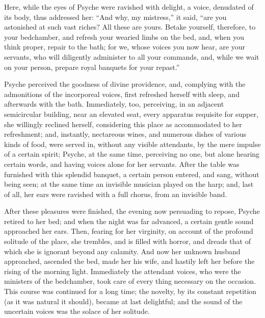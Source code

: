 \documentclass[12pt]{article}
\begin{document}
Here, while the eyes of Psyche were ravished with delight, a voice, denudated
of its body, thus addressed her: ``And why, my mistress,'' it said, ``are you
astonished at such vast riches? All these are yours. Betake yourself,
therefore, to your bedchamber, and refresh your wearied limbs on the bed, and,
when you think proper, repair to the bath; for we, whose voices you now hear,
are your servants, who will diligently administer to all your commands, and,
while we wait on your person, prepare royal banquets for your repast.''

Psyche perceived the goodness of divine providence, and, complying with the
admonitions of the incorporeal voices, first refreshed herself with sleep, and
afterwards with the bath. Immediately, too, perceiving, in an adjacent
semicircular building, near an elevated seat, every apparatus requisite for
supper, she willingly reclined herself, considering this place as accommodated
to her refreshment; and, instantly, nectareous wines, and numerous dishes of
various kinds of food, were served in, without any visible attendants, by the
mere impulse of a certain spirit; Psyche, at the same time, perceiving no one,
but alone hearing certain words, and having voices alone for her servants.
After the table was furnished with this splendid banquet, a certain person
entered, and sang, without being seen; at the same time an invisible musician
played on the harp; and, last of all, her ears were ravished with a full
chorus, from an invisible band.

After these pleasures were finished, the evening now persuading to repose,
Psyche retired to her bed; and when the night was far advanced, a certain
gentle sound approached her ears. Then, fearing for her virginity, on account
of the profound solitude of the place, she trembles, and is filled with horror,
and dreads that of which she is ignorant beyond any calamity. And now her
unknown husband approached, ascended the bed, made her his wife, and hastily
left her before the rising of the morning light. Immediately the attendant
voices, who were the ministers of the bedchamber, took care of every thing
necessary on the occasion. This course was continued for a long time; the
novelty, by its constant repetition (as it was natural it should), became at
last delightful; and the sound of the uncertain voices was the solace of her
solitude.
\end{document}
